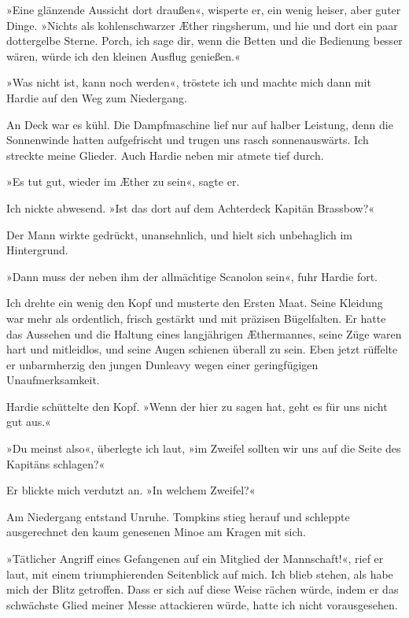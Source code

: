 »Eine glänzende Aussicht dort draußen«, wisperte er, ein wenig
heiser, aber guter Dinge. »Nichts als kohlenschwarzer Æther
ringsherum, und hie und dort ein paar dottergelbe Sterne. Porch,
ich sage dir, wenn die Betten und die Bedienung besser wären, würde
ich den kleinen Ausflug genießen.«

»Was nicht ist, kann noch werden«, tröstete ich und machte mich
dann mit Hardie auf den Weg zum Niedergang.

\bigpar

An Deck war es kühl. Die Dampfmaschine lief nur auf halber
Leistung, denn die Sonnenwinde hatten aufgefrischt und trugen uns
rasch sonnenauswärts. Ich streckte meine Glieder. Auch Hardie neben
mir atmete tief durch.

»Es tut gut, wieder im Æther zu sein«, sagte er.

Ich nickte abwesend. »Ist das dort auf dem Achterdeck Kapitän
Brassbow?«

Der Mann wirkte gedrückt, unansehnlich, und hielt sich unbehaglich
im Hintergrund.

»Dann muss der neben ihm der allmächtige Scanolon sein«, fuhr
Hardie fort.

Ich drehte ein wenig den Kopf und musterte den Ersten Maat. Seine
Kleidung war mehr als ordentlich, frisch gestärkt und mit präzisen
Bügelfalten. Er hatte das Aussehen und die Haltung eines
langjährigen Æthermannes, seine Züge waren hart und mitleidlos, und
seine Augen schienen überall zu sein. Eben jetzt rüffelte er
unbarmherzig den jungen Dunleavy wegen einer geringfügigen
Unaufmerksamkeit.

\bigpar

Hardie schüttelte den Kopf. »Wenn der hier zu sagen hat, geht es
für uns nicht gut aus.«

»Du meinst also«, überlegte ich laut, »im Zweifel sollten wir uns
auf die Seite des Kapitäns schlagen?«

Er blickte mich verdutzt an. »In welchem Zweifel?«

\bigpar

Am Niedergang entstand Unruhe. Tompkins stieg herauf und schleppte
ausgerechnet den kaum genesenen Minoe am Kragen mit sich.

»Tätlicher Angriff eines Gefangenen auf ein Mitglied der
Mannschaft!«, rief er laut, mit einem triumphierenden Seitenblick
auf mich. Ich blieb stehen, als habe mich der Blitz getroffen. Dass
er sich auf diese Weise rächen würde, indem er das schwächste Glied
meiner Messe attackieren würde, hatte ich nicht vorausgesehen.

